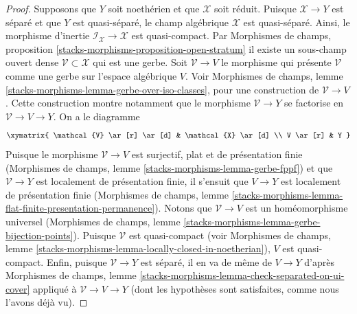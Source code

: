\begin{proof}
\medskip\noindent
Supposons que $Y$ soit noethérien et que $\mathcal{X}$ soit réduit.
Puisque $\mathcal{X} \to Y$ est séparé et que $Y$ est quasi-séparé,
le champ algébrique $\mathcal{X}$ est quasi-séparé.
Ainsi, le morphisme d'inertie $\mathcal{I}_\mathcal{X} \to \mathcal{X}$
est quasi-compact. Par Morphismes de champs, proposition
\ref{stacks-morphisms-proposition-open-stratum}
il existe un sous-champ ouvert dense $\mathcal{V} \subset \mathcal{X}$
qui est une gerbe. Soit $\mathcal{V} \to V$ le morphisme
qui présente $\mathcal{V}$ comme une gerbe sur l'espace algébrique $V$.
Voir
Morphismes de champs, lemme \ref{stacks-morphisms-lemma-gerbe-over-iso-classes},
pour une construction de $\mathcal{V} \to V$.
Cette construction montre notamment que le morphisme
$\mathcal{V} \to Y$ se factorise en $\mathcal{V} \to V \to Y$.
On a le diagramme
$$
\xymatrix{
\mathcal{V} \ar[r] \ar[d] & \mathcal{X} \ar[d] \\
V \ar[r] & Y
}
$$
Puisque le morphisme $\mathcal{V} \to V$ est surjectif, plat et
de présentation finie
(Morphismes de champs, lemme \ref{stacks-morphisms-lemma-gerbe-fppf})
et que $\mathcal{V} \to Y$ est localement de présentation finie,
il s'ensuit que $V \to Y$ est localement de présentation finie
(Morphismes de champs, lemme
\ref{stacks-morphisms-lemma-flat-finite-presentation-permanence}).
Notons que $\mathcal{V} \to V$ est un homéomorphisme universel
(Morphismes de champs, lemme
\ref{stacks-morphisms-lemma-gerbe-bijection-points}).
Puisque $\mathcal{V}$ est quasi-compact (voir
Morphismes de champs, lemme
\ref{stacks-morphisms-lemma-locally-closed-in-noetherian}),
$V$ est quasi-compact.
Enfin, puisque $\mathcal{V} \to Y$ est séparé, il en va de même
de $V \to Y$ d'après
Morphismes de champs, lemme
\ref{stacks-morphisms-lemma-check-separated-on-ui-cover}
appliqué à $\mathcal{V} \to V \to Y$
(dont les hypothèses sont satisfaites, comme nous l'avons déjà vu).


\end{proof}

